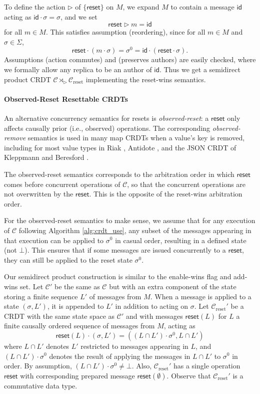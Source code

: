 \documentclass[acmsmall,nonacm,12pt]{acmart}
\newcommand{\mc}[1]{\ensuremath{\mathcal{#1}}}
\newcommand{\msf}[1]{\ensuremath{\mathsf{#1}}}
\newcommand{\act}{\triangleright}
\theoremstyle{plain}
\theoremstyle{definition}
\begin{document}
To define the action $\act$ of $\{\msf{reset}\}$ on $M$, we expand $M$ to contain a message $\msf{id}$ acting as $\msf{id} \cdot \sigma = \sigma$, and we set
\[
\msf{reset} \act m = \msf{id}
\]
for all $m \in M$.  This satisfies assumption (reordering), since for all $m \in M$ and $\sigma \in \Sigma$,
\[
\msf{reset} \cdot (m \cdot \sigma) = \sigma^0 = \msf{id} \cdot (\msf{reset} \cdot \sigma).
\]
Assumptions (action commutes) and (preserves authors) are easily checked, where we formally allow any replica to be an author of $\msf{id}$.  Thus we get a semidirect product CRDT $\mc{C} \rtimes_\act \mc{C}_{\text{reset}}$ implementing the reset-wins semantics.


\paragraph{Observed-Reset Resettable CRDTs}
An alternative concurrency semantics for resets is \textit{observed-reset}: a $\msf{reset}$ only affects causally prior (i.e., observed) operations.  The corresponding \textit{observed-remove} semantics is used in many map CRDTs when a value's key is removed, including for most value types in Riak \cite{riak_datatypes}, Antidote \cite{antidote}, and the JSON CRDT of Kleppmann and Beresford \cite{json}.

The observed-reset semantics corresponds to the arbitration order in which $\msf{reset}$ comes before concurrent operations of $\mc{C}$, so that the concurrent operations are not overwritten by the $\msf{reset}$.  This is the opposite of the reset-wins arbitration order.

For the observed-reset semantics to make sense, we assume that for any execution of $\mc{C}$ following Algorithm \ref{alg:crdt_use}, any subset of the messages appearing in that execution can be applied to $\sigma^0$ in casual order, resulting in a defined state (not $\bot$).  This ensures that if some messages are issued concurrently to a $\msf{reset}$, they can still be applied to the reset state $\sigma^0$.

Our semidirect product construction is similar to the enable-wins flag and add-wins set.  Let $\mc{C}'$ be the same as $\mc{C}$ but with an extra component of the state storing a finite sequence $L'$ of messages from $M$.  When a message is applied to a state $(\sigma, L')$, it is appended to $L'$ in addition to acting on $\sigma$.  Let $\mc{C}_{\text{reset}}'$ be a CRDT with the same state space as $\mc{C}'$ and with messages $\msf{reset}(L)$ for $L$ a finite causally ordered sequence of messages from $M$, acting as
\[
\msf{reset}(L) \cdot (\sigma, L') = ((L \cap L') \cdot \sigma^0, L \cap L')
\]
where $L \cap L'$ denotes $L'$ restricted to messages appearing in $L$, and $(L \cap L') \cdot \sigma^0$ denotes the result of applying the messages in $L \cap L'$ to $\sigma^0$ in order.  By assumption, $(L \cap L') \cdot \sigma^0 \neq \bot$.  Also, $\mc{C}_{\text{reset}}'$ has a single operation $\msf{reset}$ with corresponding prepared message $\msf{reset}(\emptyset)$.  Observe that $\mc{C}_{\text{reset}}'$ is a commutative data type.
\end{document}
